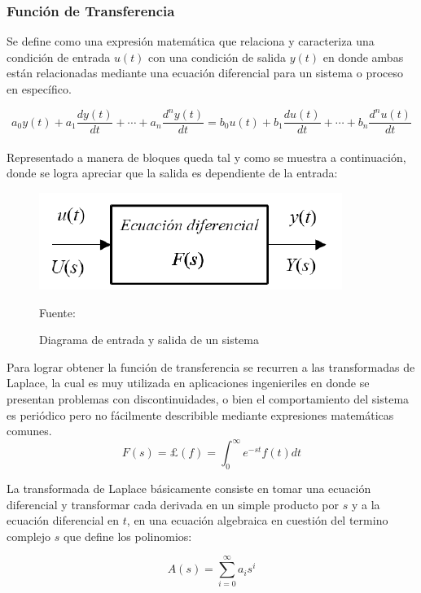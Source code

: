 \subsubsection{Función de Transferencia}

Se define como una expresión matemática que relaciona y caracteriza una condición de entrada $u(t)$ con una condición de salida $y(t)$ en donde ambas están relacionadas mediante una ecuación diferencial para un sistema o proceso en específico. \cite{transferencia}

\begin{equation}\label{4}
    a_{0}y(t)+ a_{1}\frac{dy(t)}{dt}+\cdots+a_{n}\frac{d^{n}y(t)}{dt}=b_{0}u(t)+b_{1}\frac{du(t)}{dt}+\cdots +b_{n}\frac{d^{n}u(t)}{dt}
\end{equation}
\\
Representado a manera de bloques queda tal y como se muestra a continuación, donde se logra apreciar que la salida es dependiente de la entrada:

\begin{figure}[H]
\centering
\includegraphics[scale=0.8]{Figuras/f.png}
\caption{Diagrama de entrada y salida de un sistema}
Fuente:\cite{transferencia}
\label{trans}
\end{figure}

Para lograr obtener la función de transferencia se recurren a las transformadas de Laplace, la cual es muy utilizada en aplicaciones ingenieriles en donde se presentan problemas con discontinuidades, o bien el comportamiento del sistema es periódico pero no fácilmente describible mediante expresiones matemáticas comunes.
\begin{equation}\label{laplace}
    F(s)=\pounds (f)=\int_{0}^{\infty }e^{-st}f(t)dt
\end{equation}

La transformada de Laplace básicamente consiste en tomar una ecuación diferencial y transformar cada derivada en un simple producto por $s$ y a la ecuación diferencial en $t$, en una ecuación algebraica en cuestión del termino complejo $s$ que define los polinomios: \cite{transferencia}

\begin{equation}\label{poli1}
    A(s)=\sum_{i=0}^{\infty }a_{i}s^{i}
\end{equation}

